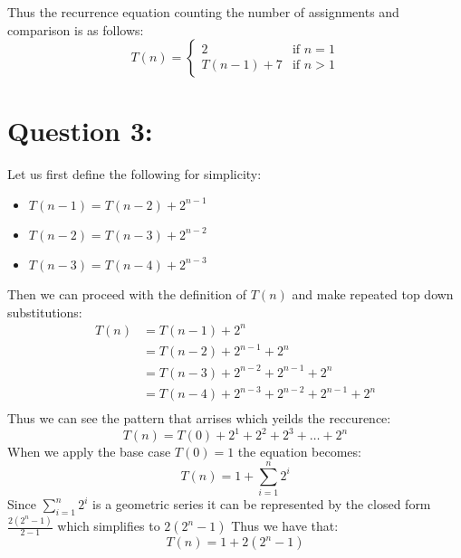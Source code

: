 \documentclass{article}
\begin{document}
Thus the recurrence equation counting the number of assignments and comparison is as follows: $$T(n)=\begin{cases}
2 &\text{if } n=1\\
T(n-1)+7 &\text{if } n>1
\end{cases}$$
 
\newpage
\section*{Question 3:}
Let us first define the following for simplicity:
\begin{itemize}
    \item $T(n-1)=T(n-2)+2^{n-1}$
    \item $T(n-2)=T(n-3)+2^{n-2}$
    \item $T(n-3)=T(n-4)+2^{n-3}$
\end{itemize}
Then we can proceed with the definition of $T(n)$ and make repeated top down substitutions:
$$\begin{aligned}
    T(n)&=T(n-1)+2^{n}\\
    &=T(n-2)+2^{n-1}+2^{n}\\
    &=T(n-3)+2^{n-2}+2^{n-1}+2^{n}\\
    &=T(n-4)+2^{n-3}+2^{n-2}+2^{n-1}+2^{n}\\
\end{aligned}$$
Thus we can see the pattern that arrises which yeilds the reccurence: $$T(n)=T(0)+2^{1}+2^{2}+2^{3}+\dots+2^{n}$$
When we apply the base case $T(0)=1$ the equation becomes: $$T(n)=1+\sum_{i=1}^n 2^{i}$$
Since $\sum_{i=1}^n 2^{i}$ is a geometric series it can be represented by the closed form $\frac{2(2^{n}-1)}{2-1}$ which simplifies to $2(2^{n}-1)$
Thus we have that: $$T(n)=1+2(2^{n}-1)$$


\newpage
\end{document}
